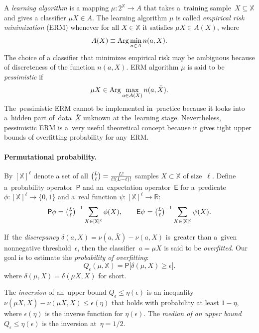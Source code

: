 \documentclass{article} %
\def\XX{\mathbb{X}}
\def\RR{\mathbb{R}}
\newcommand{\X}{\bar X}
\newcommand{\XXell}{[\XX]^\ell}
\def\CC_#1^#2{\tbinom{#1}{#2}}
\def\eps{\epsilon}
\newcommand{\Arg}{\mathop{\rm Arg}\limits}
\providecommand{\Prob}{\mathsf{P}}
\newcommand{\Expect}{\mathsf{E}}
\begin{document}
A \emph{learning algorithm} is a mapping ${\mu\colon 2^\XX \to A}$
that takes a~training sample~$X\subseteq\XX$  and gives a classifier ${\mu X \in A}$.
The learning algorithm $\mu$ is called \emph{empirical risk minimization} (ERM) whenever for all $X \in \XX$ it satisfies $\mu X \in A(X)$, where
\[
	 A(X) \equiv \Arg\min_{a\in A} n(a,X).
\]
The choice of a classifier that minimizes empirical risk may be ambiguous
because of discreteness of the function $n(a,X)$.
ERM algorithm $\mu$ is said to be \emph{pessimistic} if
\[
    \mu X \in \Arg\max_{a\in A(X)} n(a,\X).
\]
The~pessimistic ERM cannot be implemented in~practice
because it looks into a~hidden part of~data~$\X$ unknown at the~learning stage.
Nevertheless, pessimistic ERM is a~very useful theoretical concept
because it gives tight upper bounds of overfitting probability for any~ERM.

\paragraph{Permutational probability.}
By $\XXell$ denote a set of all
$\CC_L^\ell = \tfrac{L!}{\ell!(L-\ell)!}$
samples $X\subset\XX$ of size~$\ell$.
Define a~probability operator~$\Prob$ and an~expectation operator~$\Expect$
for a~predicate $\phi \colon \XXell \rightarrow \{0, 1\}$
and a~real function $\psi \colon \XXell \rightarrow \RR$:
\[
    \Prob \phi = {\CC_L^\ell}^{-1} \sum_{X \in \XXell} \phi(X),
    \qquad
    \Expect \psi = {\CC_L^\ell}^{-1} \sum_{X \in \XXell} \psi(X).
\]

If~the \emph{discrepancy}
$\delta(a, X) = \nu(a,\X) - \nu(a, X)$
is~greater than a~given nonnegative threshold~$\eps$,
then the classifier~$a=\mu X$ is said to be \emph{overfitted}.
Our goal is to estimate the \emph{probability of overfitting}:
\[
    Q_\eps (\mu, \XX)
    =
    \Prob\bigl[
        \delta(\mu, X) \geq \eps
    \bigr].
\]
where
$\delta(\mu, X) = \delta(\mu X, X)$ for short.

The \emph{inversion} of an~upper bound $Q_\eps \leq \eta(\eps)$  is an inequality
$\nu(\mu X,\X) - \nu(\mu X, X) \leq \eps(\eta)$
that holds with probability at least $1-\eta$, where $\eps(\eta)$
is the inverse function for $\eta(\eps)$.
The \emph{median of an upper bound} $Q_\eps \leq \eta(\eps)$  is the inversion at~$\eta = 1/2$.
\end{document}
